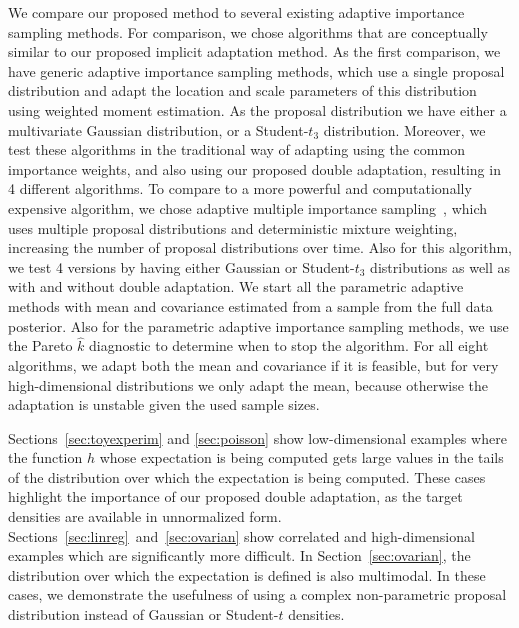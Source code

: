 \documentclass[12pt]{article}
\begin{document}
%
%
%
%
%
%
%
%
%
%
%
%
%
%
%
%
%
%

We compare our proposed method to several existing adaptive importance sampling methods.
For comparison, we chose algorithms that are conceptually similar to our proposed implicit adaptation method.
As the first comparison, we have generic adaptive importance sampling methods, which
use a single proposal distribution and
adapt the location and scale parameters of this distribution using weighted moment estimation.
As the proposal distribution we have either a multivariate Gaussian distribution, or
a Student-$t_3$ distribution. Moreover, we test these algorithms in the traditional way
of adapting using the common importance weights, and also using our proposed double adaptation, resulting
in 4 different algorithms.
To compare to a more powerful and computationally expensive algorithm, we chose
adaptive multiple importance sampling~\citep[AMIS;][]{cornuet2012adaptive}, which
uses
multiple proposal distributions and deterministic mixture weighting, increasing
the number of proposal distributions over time.
Also for this algorithm, we test 4 versions by having either Gaussian or Student-$t_3$ distributions
as well as with and without double adaptation.
We start all the parametric adaptive methods with mean and covariance
estimated from a sample from the full data posterior.
Also for the parametric adaptive importance sampling methods,
we use the Pareto $\hat{k}$ diagnostic to determine when to stop the algorithm.
%
%
%
For all eight algorithms, we adapt both the mean and covariance if it is feasible, but
for very high-dimensional distributions we only adapt the mean, because
otherwise the adaptation is unstable given the used sample sizes.
%
%


Sections~\ref{sec:toyexperim} and \ref{sec:poisson} show low-dimensional examples where
the function $h$ whose expectation is being computed gets large values in the tails
of the distribution over which the expectation is being computed. These cases highlight the importance
of our proposed double adaptation, as the target densities are available in unnormalized form.
Sections~\ref{sec:linreg}~and~\ref{sec:ovarian} show correlated and high-dimensional examples which are significantly
more difficult.
In Section~\ref{sec:ovarian}, the
distribution over which the expectation is defined is also multimodal.
In these cases, we demonstrate the usefulness of using a complex non-parametric proposal distribution
instead of Gaussian or Student-$t$ densities.
%
%
\end{document}
